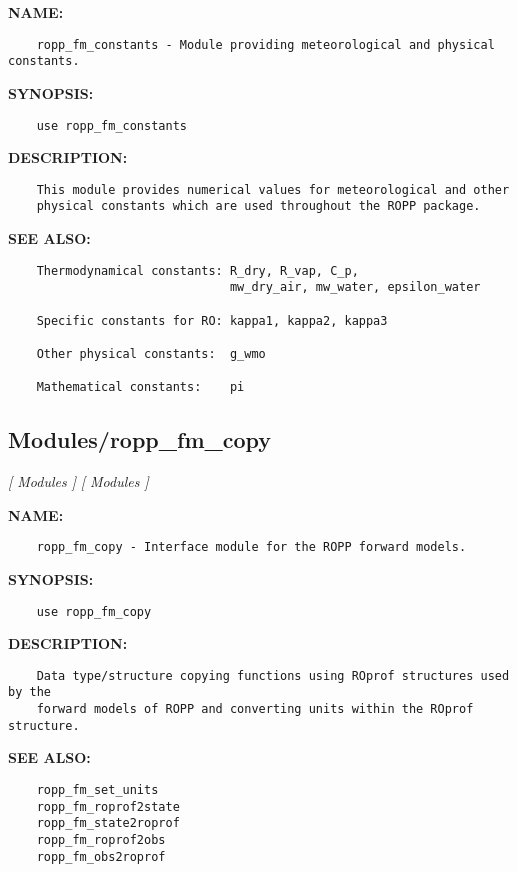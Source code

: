 \label{ch:robo67}
\label{ch:Modules_ropp_fm_constants}
\textbf{NAME:}\hspace{0.08in}\begin{Verbatim}
    ropp_fm_constants - Module providing meteorological and physical constants.
\end{Verbatim}
\textbf{SYNOPSIS:}\hspace{0.08in}\begin{Verbatim}
    use ropp_fm_constants
\end{Verbatim}
\textbf{DESCRIPTION:}\hspace{0.08in}\begin{Verbatim}
    This module provides numerical values for meteorological and other
    physical constants which are used throughout the ROPP package.
\end{Verbatim}
\textbf{SEE ALSO:}\hspace{0.08in}\begin{Verbatim}
    Thermodynamical constants: R_dry, R_vap, C_p,
                               mw_dry_air, mw_water, epsilon_water

    Specific constants for RO: kappa1, kappa2, kappa3

    Other physical constants:  g_wmo

    Mathematical constants:    pi
\end{Verbatim}
\subsection{Modules/ropp\_fm\_copy}
\textsl{[ Modules ]}
\textsl{[ Modules ]}

\label{ch:robo68}
\label{ch:Modules_ropp_fm_copy}
\textbf{NAME:}\hspace{0.08in}\begin{Verbatim}
    ropp_fm_copy - Interface module for the ROPP forward models.
\end{Verbatim}
\textbf{SYNOPSIS:}\hspace{0.08in}\begin{Verbatim}
    use ropp_fm_copy
\end{Verbatim}
\textbf{DESCRIPTION:}\hspace{0.08in}\begin{Verbatim}
    Data type/structure copying functions using ROprof structures used by the
    forward models of ROPP and converting units within the ROprof structure.
\end{Verbatim}
\textbf{SEE ALSO:}\hspace{0.08in}\begin{Verbatim}
    ropp_fm_set_units
    ropp_fm_roprof2state
    ropp_fm_state2roprof
    ropp_fm_roprof2obs
    ropp_fm_obs2roprof
\end{Verbatim}
